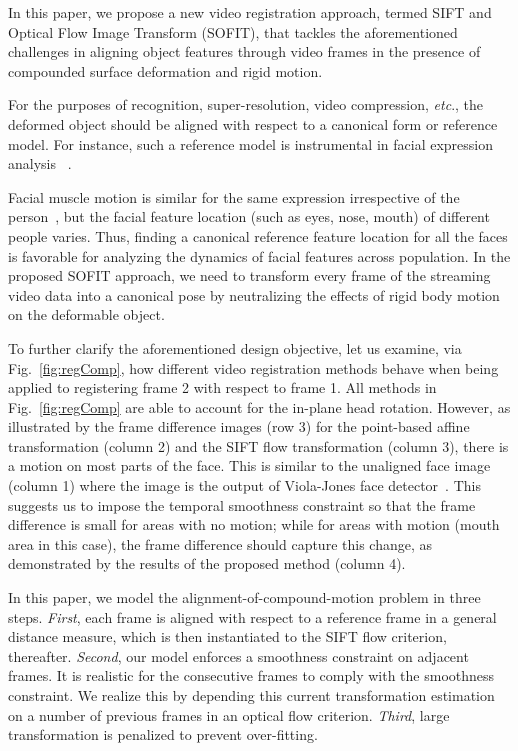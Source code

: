 \documentclass[10pt,journal]{IEEEtran}
\begin{document}
In this paper, we propose a new video registration approach, termed SIFT and Optical Flow Image Transform (SOFIT), that tackles the aforementioned challenges in aligning object features through video frames in the presence of compounded surface deformation and rigid motion.

For the purposes of recognition, super-resolution, video compression, \textit{etc}., the deformed object should be aligned with respect to a canonical form or reference model.
For instance, such a reference model is instrumental in facial expression analysis ~\cite{Yang_SMCB12}.

Facial muscle motion is similar for the same expression irrespective of the person~\cite{Ekman78}, but the facial feature location (such as eyes, nose, mouth) of different people varies. Thus, finding a canonical reference feature location for all the faces is favorable for analyzing the dynamics of facial features across population. In the proposed SOFIT approach, we need to transform every frame of the streaming video data into a canonical pose by neutralizing the effects of rigid body motion on the deformable object.

To further clarify the aforementioned design objective, let us examine, via Fig.~\ref{fig:regComp}, how different video registration methods behave when being applied to registering frame 2 with respect to frame 1.  All methods in Fig.~\ref{fig:regComp} are able to account for the in-plane head rotation. However, as illustrated by the frame difference images (row 3) for the point-based affine transformation (column 2) and the SIFT flow transformation (column 3), there is a motion on most parts of the face. This is similar to the unaligned face image (column 1) where the image is the output of Viola-Jones face detector~\cite{Viola_IJCV04}. This suggests us to impose the temporal smoothness constraint so that the frame difference is small for areas with no motion; while for areas with motion (mouth area in this case), the frame difference should capture this change, as demonstrated by the results of the proposed method (column 4).

In this paper, we model the alignment-of-compound-motion problem in three steps. \textit{First}, each frame is aligned with respect to a reference frame in a general distance measure, which is then instantiated to the SIFT flow criterion, thereafter. \textit{Second}, our model enforces a smoothness constraint on adjacent frames. It is realistic for the consecutive frames to comply with the smoothness constraint. We realize this by depending this current transformation estimation on a number of previous frames in an optical flow criterion. \textit{Third}, large transformation is penalized to prevent over-fitting. 
\end{document}

